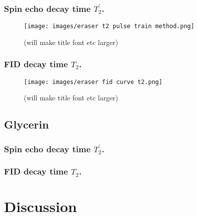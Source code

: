 \documentclass[%
 reprint,
 amsmath,amssymb,
 aps,
]{revtex4-2}
\begin{document}
\subsubsection{ Spin echo decay time $T_2^{'}$. }
\begin{figure}[H]
\centering
\texttt{[image: images/eraser t2 pulse train method.png]}%
\caption{\label{fig:wide}(will make title font etc larger)}
\end{figure}


\subsubsection{FID decay time $T_2$.}
\begin{figure}[H]
\centering
\texttt{[image: images/eraser fid curve t2.png]}%
\caption{\label{fig:wide}(will make title font etc larger)}
\end{figure}








\subsection{Glycerin}

\subsubsection{Spin echo decay time $T_2^{'}$.}
\subsubsection{FID decay time $T_2$.}



\section{Discussion}



\end{document}

